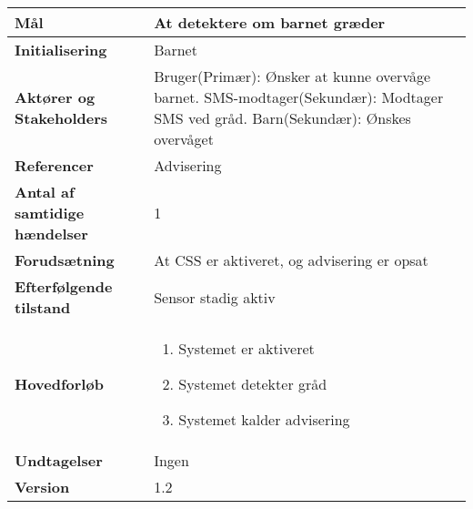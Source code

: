 \begin{table}[H] \centering
\begin{tabular}{|p{6cm}|p{8cm}|}
	\hline
\textbf{Mål}								
&At detektere om barnet græder \\\hline
\textbf{Initialisering}					
&Barnet  \\\hline
\textbf{Aktører og Stakeholders}			
&Bruger(Primær): Ønsker at kunne overvåge barnet. SMS-modtager(Sekundær): 					Modtager SMS ved gråd. Barn(Sekundær): Ønskes overvåget 				 \\\hline
\textbf{Referencer}						
&Advisering \\\hline
\textbf{Antal af samtidige hændelser}	
&1 \\\hline
\textbf{Forudsætning}					
&At CSS er aktiveret, og advisering er opsat \\\hline
\textbf{Efterfølgende tilstand}			
&Sensor stadig aktiv \\\hline
\textbf{Hovedforløb}						
&\begin{enumerate}
	
				\item Systemet er aktiveret
												
				\item Systemet detekter gråd
												
				\item Systemet kalder advisering
								
			\end{enumerate}\\\hline
			
\textbf{Undtagelser}					
&Ingen \\\hline
		\textbf{Version}		&1.2 \\\hline
	\end{tabular}
	\label{UC5} 
\end{table}

